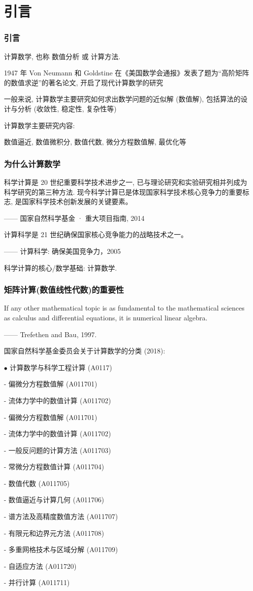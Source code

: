\documentclass[notheorems,serif]{beamer}
\begin{document}
\section{引言}
\begin{frame}
\frametitle{引言}
计算数学, 也称 数值分析 或 计算方法.


1947 年 Von Neumann 和 Goldstine 在《美国数学会通报》发表了题为“高阶矩阵的数值求逆”的著名论文, 开启了现代计算数学的研究


一般来说, 计算数学主要研究如何求出数学问题的近似解 (数值解), 包括算法的设计与分析 (收敛性, 稳定性, 复杂性等)
	
计算数学主要研究内容:
	
数值逼近, 数值微积分, 数值代数, 微分方程数值解, 最优化等
\end{frame}

\begin{frame}
\frametitle{为什么计算数学}
科学计算是 20 世纪重要科学技术进步之一, 已与理论研究和实验研究相并列成为科学研究的第三种方法. 现今科学计算已是体现国家科学技术核心竞争力的重要标志, 是国家科学技术创新发展的关键要素。

\qquad \qquad \qquad \qquad \qquad \qquad  —— 国家自然科学基金 · 重大项目指南, 2014

计算科学是 21 世纪确保国家核心竞争能力的战略技术之一。

\qquad \qquad \qquad \qquad \qquad \qquad    —— 计算科学: 确保美国竞争力，2005

科学计算的核心/数学基础: 计算数学.
\end{frame}

\begin{frame}
\frametitle{矩阵计算(数值线性代数)的重要性}
If any other mathematical topic is as fundamental to the mathematical
sciences as calculus and differential equations, it is numerical linear
algebra.

\qquad \qquad \qquad \qquad \qquad \qquad \qquad\qquad—— Trefethen and Bau, 1997.
\end{frame}

\begin{frame}
国家自然科学基金委员会关于计算数学的分类 (2018):

$\bullet$ 计算数学与科学工程计算 (A0117)

\qquad- 偏微分方程数值解 (A011701)

\qquad- 流体力学中的数值计算 (A011702)

\qquad- 偏微分方程数值解 (A011701)

\qquad- 流体力学中的数值计算 (A011702)

\qquad- 一般反问题的计算方法 (A011703)

\qquad- 常微分方程数值计算 (A011704)

\qquad- 数值代数 (A011705)

\qquad- 数值逼近与计算几何 (A011706)

\qquad- 谱方法及高精度数值方法 (A011707)

\qquad- 有限元和边界元方法 (A011708)

\qquad- 多重网格技术与区域分解 (A011709)

\qquad- 自适应方法 (A011720)

\qquad- 并行计算 (A011711)
\end{frame}
\end{document}
